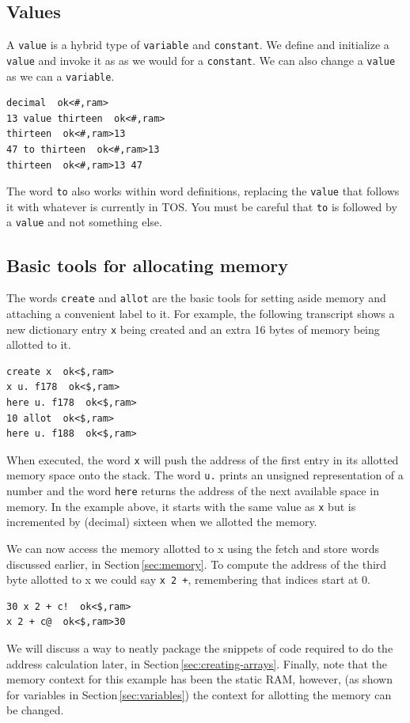 \documentclass[12pt,a4paper]{article}
\begin{document}
\medskip
\subsection{Values}
\label{sec:values}
%
A \verb!value! is a hybrid type of \verb!variable! and \verb!constant!.
We define and initialize a \verb!value! and invoke it as as we would for a \verb!constant!.
We can also change a \verb!value! as we can a \verb!variable!.
\begin{verbatim}
decimal  ok<#,ram>
13 value thirteen  ok<#,ram>
thirteen  ok<#,ram>13 
47 to thirteen  ok<#,ram>13 
thirteen  ok<#,ram>13 47 
\end{verbatim}
The word \verb!to! also works within word definitions, replacing the \verb!value! that
follows it with whatever is currently in TOS.
You must be careful that \verb!to! is followed by a \verb!value! and not something else.


\medskip
\subsection{Basic tools for allocating memory}
\label{sec:allocating-memory}
%
The words \verb!create! and \verb!allot! are the basic tools for setting aside memory
and attaching a convenient label to it.
For example, the following transcript shows a new dictionary entry \verb!x! being created 
and an extra 16 bytes of memory being allotted to it.
\begin{verbatim}
create x  ok<$,ram>
x u. f178  ok<$,ram>
here u. f178  ok<$,ram>
10 allot  ok<$,ram>
here u. f188  ok<$,ram>
\end{verbatim}
When executed, the word \verb!x! will push the address of the first entry 
in its allotted memory space onto the stack.
The word \verb!u.! prints an unsigned representation of a number and 
the word \verb!here! returns the address of the next available space in memory.
In the example above, it starts with the same value as \verb!x! but is incremented 
by (decimal) sixteen when we allotted the memory.

\medskip
We can now access the memory allotted to x using the fetch and store words 
discussed earlier, in Section\,\ref{sec:memory}.
To compute the address of the third byte allotted to x we could say \verb!x 2 +!,
remembering that indices start at 0.
\begin{verbatim}
30 x 2 + c!  ok<$,ram>
x 2 + c@  ok<$,ram>30 
\end{verbatim}
We will discuss a way to neatly package the snippets of code required to do the address
calculation later, in Section\,\ref{sec:creating-arrays}.
Finally, note that the memory context for this example has been the static RAM, however, 
(as shown for variables in Section\,\ref{sec:variables})
the context for allotting the memory can be changed.
\end{document}
